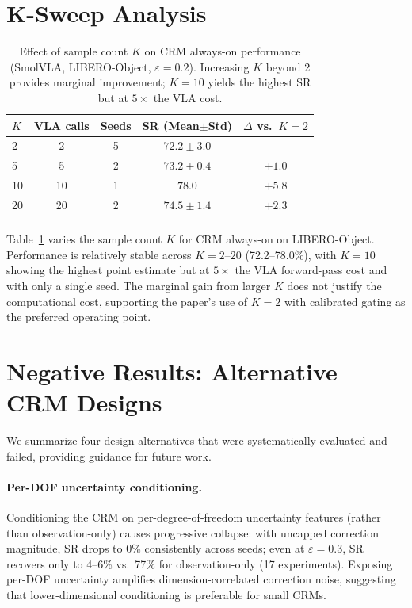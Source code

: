 \section{K-Sweep Analysis}
\label{sec:k_sweep}

\begin{table}[h]
\centering
\caption{Effect of sample count $K$ on CRM always-on performance (SmolVLA, LIBERO-Object, $\varepsilon{=}0.2$). Increasing $K$ beyond 2 provides marginal improvement; $K{=}10$ yields the highest SR but at $5{\times}$ the VLA cost.}
\label{tab:k_sweep}
\small
\begin{tabular}{lcccc}
\toprule
$K$ & VLA calls & Seeds & SR (Mean$\pm$Std) & $\Delta$ vs.\ $K{=}2$ \\
\midrule
2 & 2 & 5 & $72.2 \pm 3.0$ & --- \\
5 & 5 & 2 & $73.2 \pm 0.4$ & $+1.0$ \\
10 & 10 & 1 & $78.0$ & $+5.8$ \\
20 & 20 & 2 & $74.5 \pm 1.4$ & $+2.3$ \\
\bottomrule
\addlinespace[2pt]
\multicolumn{5}{l}{\scriptsize $K{=}2$: from Table~\ref{tab:crm_perseed} ($n{=}5$). $K{=}10$ uses $\varepsilon{=}0.05$ (single seed).}
\end{tabular}
\end{table}

 Table~\ref{tab:k_sweep} varies the sample count $K$ for CRM always-on on LIBERO-Object. Performance is relatively stable across $K{=}2$--$20$ (72.2--78.0\%), with $K{=}10$ showing the highest point estimate but at $5{\times}$ the VLA forward-pass cost and with only a single seed. The marginal gain from larger $K$ does not justify the computational cost, supporting the paper's use of $K{=}2$ with calibrated gating as the preferred operating point.

\section{Negative Results: Alternative CRM Designs}
\label{sec:negative_results}

 We summarize four design alternatives that were systematically evaluated and failed, providing guidance for future work.

\paragraph{Per-DOF uncertainty conditioning.}
Conditioning the CRM on per-degree-of-freedom uncertainty features (rather than observation-only) causes progressive collapse: with uncapped correction magnitude, SR drops to 0\% consistently across seeds; even at $\varepsilon{=}0.3$, SR recovers only to 4--6\% vs.\ 77\% for observation-only (17 experiments). Exposing per-DOF uncertainty amplifies dimension-correlated correction noise, suggesting that lower-dimensional conditioning is preferable for small CRMs.

